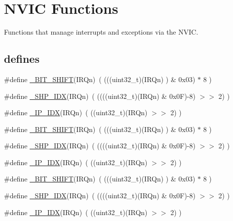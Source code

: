 \hypertarget{group___c_m_s_i_s___core___n_v_i_c_functions}{}\section{N\+V\+IC Functions}
\label{group___c_m_s_i_s___core___n_v_i_c_functions}


Functions that manage interrupts and exceptions via the N\+V\+IC.  


\subsection*{\textquotesingle{}defines\textquotesingle{}}
\begin{DoxyCompactItemize}
\item 
\#define \hyperlink{group___c_m_s_i_s___core___n_v_i_c_functions_ga53c75b28823441c6153269f0ecbed878}{\+\_\+\+B\+I\+T\+\_\+\+S\+H\+I\+FT}(I\+R\+Qn)~(  (((uint32\+\_\+t)(I\+R\+Qn)       )    \&  0x03) $\ast$ 8 )
\item 
\#define \hyperlink{group___c_m_s_i_s___core___n_v_i_c_functions_gaee4f7eb5d7e770ad51489dbceabb1755}{\+\_\+\+S\+H\+P\+\_\+\+I\+DX}(I\+R\+Qn)~( ((((uint32\+\_\+t)(I\+R\+Qn) \& 0x0\+F)-\/8) $>$$>$    2)     )
\item 
\#define \hyperlink{group___c_m_s_i_s___core___n_v_i_c_functions_ga370ec4b1751a6a889d849747df3763a9}{\+\_\+\+I\+P\+\_\+\+I\+DX}(I\+R\+Qn)~(   ((uint32\+\_\+t)(I\+R\+Qn)            $>$$>$    2)     )
\item 
\#define \hyperlink{group___c_m_s_i_s___core___n_v_i_c_functions_ga53c75b28823441c6153269f0ecbed878}{\+\_\+\+B\+I\+T\+\_\+\+S\+H\+I\+FT}(I\+R\+Qn)~(  (((uint32\+\_\+t)(I\+R\+Qn)       )    \&  0x03) $\ast$ 8 )
\item 
\#define \hyperlink{group___c_m_s_i_s___core___n_v_i_c_functions_gaee4f7eb5d7e770ad51489dbceabb1755}{\+\_\+\+S\+H\+P\+\_\+\+I\+DX}(I\+R\+Qn)~( ((((uint32\+\_\+t)(I\+R\+Qn) \& 0x0\+F)-\/8) $>$$>$    2)     )
\item 
\#define \hyperlink{group___c_m_s_i_s___core___n_v_i_c_functions_ga370ec4b1751a6a889d849747df3763a9}{\+\_\+\+I\+P\+\_\+\+I\+DX}(I\+R\+Qn)~(   ((uint32\+\_\+t)(I\+R\+Qn)            $>$$>$    2)     )
\item 
\#define \hyperlink{group___c_m_s_i_s___core___n_v_i_c_functions_ga53c75b28823441c6153269f0ecbed878}{\+\_\+\+B\+I\+T\+\_\+\+S\+H\+I\+FT}(I\+R\+Qn)~(  (((uint32\+\_\+t)(I\+R\+Qn)       )    \&  0x03) $\ast$ 8 )
\item 
\#define \hyperlink{group___c_m_s_i_s___core___n_v_i_c_functions_gaee4f7eb5d7e770ad51489dbceabb1755}{\+\_\+\+S\+H\+P\+\_\+\+I\+DX}(I\+R\+Qn)~( ((((uint32\+\_\+t)(I\+R\+Qn) \& 0x0\+F)-\/8) $>$$>$    2)     )
\item 
\#define \hyperlink{group___c_m_s_i_s___core___n_v_i_c_functions_ga370ec4b1751a6a889d849747df3763a9}{\+\_\+\+I\+P\+\_\+\+I\+DX}(I\+R\+Qn)~(   ((uint32\+\_\+t)(I\+R\+Qn)            $>$$>$    2)     )
\end{DoxyCompactItemize}
